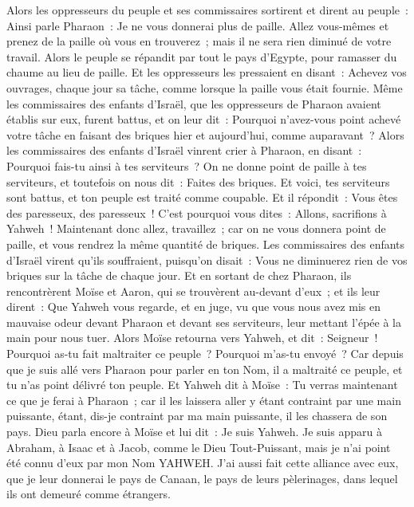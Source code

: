 \begin{multicols}{2}
Alors les oppresseurs du peuple et ses commissaires sortirent et dirent au peuple~: Ainsi parle Pharaon~: Je ne vous donnerai plus de paille.
Allez vous-mêmes et prenez de la paille où vous en trouverez~; mais il ne sera rien diminué de votre travail.
Alors le peuple se répandit par tout le pays d'Egypte, pour ramasser du chaume au lieu de paille.
Et les oppresseurs les pressaient en disant~: Achevez vos ouvrages, chaque jour sa tâche, comme lorsque la paille vous était fournie.
Même les commissaires des enfants d'Israël, que les oppresseurs de Pharaon avaient établis sur eux, furent battus, et on leur dit~: Pourquoi n'avez-vous point achevé votre tâche en faisant des briques hier et aujourd'hui, comme auparavant~?
Alors les commissaires des enfants d'Israël vinrent crier à Pharaon, en disant~: Pourquoi fais-tu ainsi à tes serviteurs~?
On ne donne point de paille à tes serviteurs, et toutefois on nous dit~: Faites des briques. Et voici, tes serviteurs sont battus, et ton peuple est traité comme coupable.
Et il répondit~: Vous êtes des paresseux, des paresseux~! C'est pourquoi vous dites~: Allons, sacrifions à Yahweh~!
Maintenant donc allez, travaillez~; car on ne vous donnera point de paille, et vous rendrez la même quantité de briques.
Les commissaires des enfants d'Israël virent qu'ils souffraient, puisqu'on disait~: Vous ne diminuerez rien de vos briques sur la tâche de chaque jour.
Et en sortant de chez Pharaon, ils rencontrèrent Moïse et Aaron, qui se trouvèrent au-devant d'eux~;
et ils leur dirent~: Que Yahweh vous regarde, et en juge, vu que vous nous avez mis en mauvaise odeur devant Pharaon et devant ses serviteurs, leur mettant l'épée à la main pour nous tuer.
Alors Moïse retourna vers Yahweh, et dit~: Seigneur~! Pourquoi as-tu fait maltraiter ce peuple~? Pourquoi m'as-tu envoyé~?
Car depuis que je suis allé vers Pharaon pour parler en ton Nom, il a maltraité ce peuple, et tu n'as point délivré ton peuple.
\VerseOne{}Et Yahweh dit à Moïse~: Tu verras maintenant ce que je ferai à Pharaon~; car il les laissera aller y étant contraint par une main puissante, étant, dis-je contraint par ma main puissante, il les chassera de son pays.
Dieu parla encore à Moïse et lui dit~: Je suis Yahweh.
Je suis apparu à Abraham, à Isaac et à Jacob, comme le Dieu Tout-Puissant, mais je n'ai point été connu d'eux par mon Nom YAHWEH.
J'ai aussi fait cette alliance avec eux, que je leur donnerai le pays de Canaan, le pays de leurs pèlerinages, dans lequel ils ont demeuré comme étrangers.

\end{multicols}

